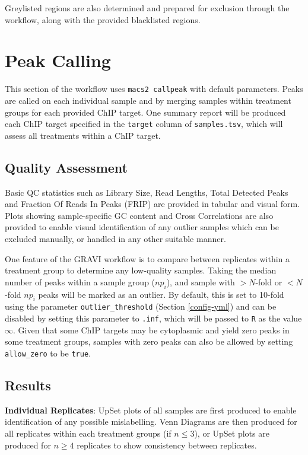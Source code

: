 \documentclass[
]{book}
\begin{document}
Greylisted regions are also determined and prepared for exclusion through the workflow, along with the provided blacklisted regions.

\hypertarget{peak-calling}{%
\section{Peak Calling}\label{peak-calling}}

This section of the workflow uses \texttt{macs2\ callpeak}\citep{macs2} with default parameters.
Peaks are called on each individual sample and by merging samples within treatment groups for each provided ChIP target.
One summary report will be produced each ChIP target specified in the \texttt{target} column of \texttt{samples.tsv}, which will assess all treatments within a ChIP target.

\hypertarget{quality-assessment}{%
\subsection*{Quality Assessment}\label{quality-assessment}}

Basic QC statistics such as Library Size, Read Lengths, Total Detected Peaks and Fraction Of Reads In Peaks (FRIP) are provided in tabular and visual form.
Plots showing sample-specific GC content and Cross Correlations are also provided to enable visual identification of any outlier samples which can be excluded manually, or handled in any other suitable manner.

One feature of the GRAVI workflow is to compare between replicates within a treatment group to determine any low-quality samples.
Taking the median number of peaks within a sample group (\(np_i\)), and sample with \(>N\)-fold or \(<N\)-fold \(np_i\) peaks will be marked as an outlier.
By default, this is set to 10-fold using the parameter \texttt{outlier\_threshold} (Section \ref{config-yml}) and can be disabled by setting this parameter to \texttt{.inf}, which will be passed to \texttt{R} as the value \(\infty\).
Given that some ChIP targets may be cytoplasmic and yield zero peaks in some treatment groups, samples with zero peaks can also be allowed by setting \texttt{allow\_zero} to be \texttt{true}.

\hypertarget{results}{%
\subsection*{Results}\label{results}}

\textbf{Individual Replicates}: UpSet plots\citep{upsetr} of all samples are first produced to enable identification of any possible mislabelling.
Venn Diagrams are then produced for all replicates within each treatment groups (if \(n \leq3\)), or UpSet plots are produced for \(n \geq4\) replicates to show consistency between replicates.
\end{document}

